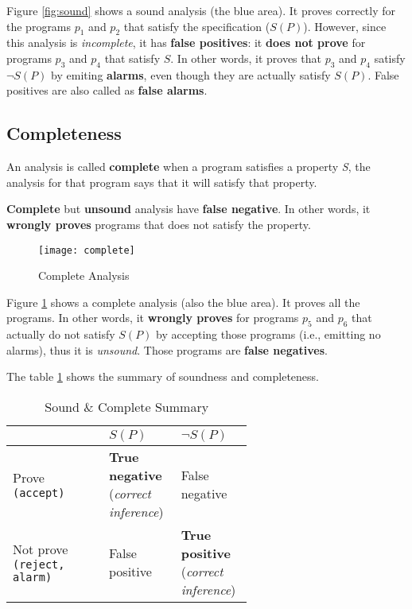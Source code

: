 Figure \ref{fig:sound} shows a sound analysis (the blue area). It
proves correctly for the programs $ p_1 $ and $ p_2 $ that satisfy the
specification ($S(P)$). However, since this analysis is
\textit{incomplete}, it has \textbf{false positives}: it \textbf{does
  not prove} for programs $ p_3 $ and $ p_4 $ that satisfy $S$. In
other words, it proves that $ p_3 $ and $ p_4 $ satisfy $ \neg S(P) $
by emiting \textbf{alarms}, even though they are actually satisfy
$ S(P) $. False positives are also called as \textbf{false alarms}.

\subsection{Completeness}

An analysis is called \textbf{complete} when a program satisfies a
property \textsl{S}, the analysis for that program says that it will
satisfy that property.


\textbf{Complete} but \textbf{unsound} analysis have \textbf{false
  negative}. In other words, it \textbf{wrongly proves} programs that
does not satisfy the property.


\begin{figure}[h]
  \texttt{[image: complete]}
  \caption{Complete Analysis}
  \label{fig:complete}
\end{figure}

Figure \ref{fig:complete} shows a complete analysis (also the blue
area). It proves all the programs. In other words, it \textbf{wrongly
  proves} for programs $ p_5 $ and $ p_6 $ that actually do not
satisfy $ S(P) $ by accepting those programs (i.e., emitting no
alarms), thus it is \textit{unsound}. Those programs are \textbf{false
  negatives}.


The table \ref{tab:summary} shows the summary of soundness and
completeness.

\begin{table}[ht]
  \centering
  \caption{Sound \& Complete Summary}
  \label{tab:summary}

  \begin{tabular}[t]{l>{\raggedright}p{0.3\linewidth}>{\raggedright\arraybackslash}p{0.3\linewidth}}
    \hline
    & $ S(P) $ & $ \neg S(P) $ \\
    \hline
    Prove \texttt{(accept)} & \textbf{True negative} (\textsl{correct inference}) & False negative \\
    Not prove \texttt{(reject, alarm)} & False positive & \textbf{True positive} (\textsl{correct inference}) \\
    \hline
  \end{tabular}
\end{table}%



